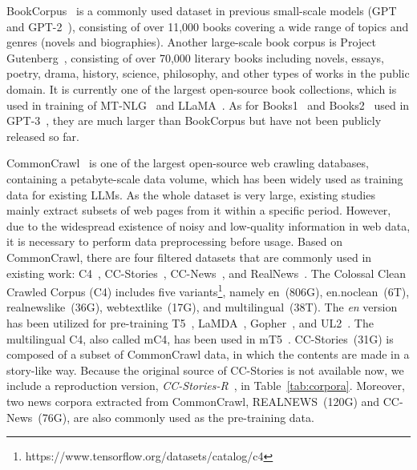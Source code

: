 {{{ BookCorpus~\cite{Zhu-ICCV-2015-Aligning} is a commonly used dataset in previous small-scale models (\eg GPT~\cite{radford-openai-2018-improving} and GPT-2~\cite{radford-blog-2019-language}), consisting of over 11,000 books covering a wide range of topics and genres (\eg novels and biographies).
Another large-scale book corpus is Project Gutenberg~\cite{Gutenberg}, consisting of over 70,000 literary books including novels, essays, poetry, drama, history, science, philosophy, and other types of works in the public domain. It is currently one of the largest open-source book collections, which is used in training of MT-NLG~\cite{Smith-CoRR-2022-Using} and LLaMA~\cite{Touvron-arxiv-2023-LLaMA}. As for Books1~\cite{Brown-NeurIPS-2020-Language} and Books2~\cite{Brown-NeurIPS-2020-Language} used in GPT-3~\cite{Brown-NeurIPS-2020-Language}, they are much larger than BookCorpus but have not been publicly released so far. 



 CommonCrawl~\cite{commoncrawl} is one of the largest open-source web crawling databases, containing a petabyte-scale data volume, which has been widely used as training data for existing LLMs.
As the whole dataset is very large, existing studies  mainly extract subsets of  web pages from it within a specific period.
However, due to the widespread existence of noisy and low-quality information in web data, it is  necessary to perform data preprocessing before usage. Based on CommonCrawl, there are four filtered datasets that are commonly used in existing work: C4~\cite{Raffel-JMLR-2020-Exploring}, CC-Stories~\cite{Trinh-CoRR-2018-A}, CC-News~\cite{Liu-CoRR-2019-RoBERTa}, and RealNews~\cite{Zellers-NeurIPS-2019-Defending}. The Colossal Clean Crawled Corpus (C4) includes five {variants}\footnote{https://www.tensorflow.org/datasets/catalog/c4 }, namely en~(806G), en.noclean~(6T), realnewslike~(36G), webtextlike~(17G), and multilingual~(38T). The \emph{en} version has been utilized for pre-training T5~\cite{Raffel-JMLR-2020-Exploring}, LaMDA~\cite{Thoppilan-CoRR-2022-LaMDA}, Gopher~\cite{Rae-arxiv-2021-Scaling}, and UL2~\cite{Tay-arxiv-2022-UL2}. The multilingual C4, also called mC4, has been used in mT5~\cite{Xue-NAACL-2021-mT5}.
{CC-Stories~(31G) is composed of a subset of CommonCrawl data, in which the contents are made in a story-like way.}
Because the original source of CC-Stories is not available now, we include  
{a reproduction version, \emph{CC-Stories-R}~\cite{CC-Stories-R},} in Table~\ref{tab:corpora}.  
{Moreover, two news corpora extracted from CommonCrawl, \ie REALNEWS~(120G) and CC-News~(76G), are also commonly used as the pre-training data.}


}}}
